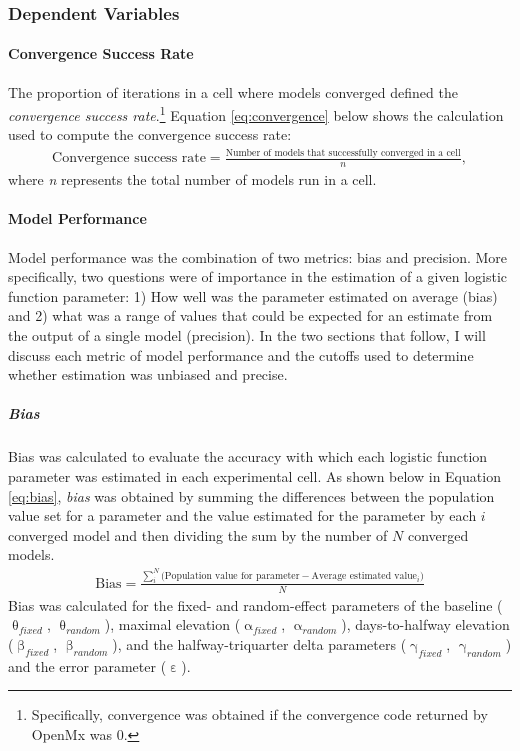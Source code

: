 \documentclass[
12pt, %
twoside,
english]{guelphthesis}
\begin{document}
\hypertarget{dependent-variables}{%
\subsubsection{Dependent Variables}\label{dependent-variables}}

\hypertarget{convergence}{%
\paragraph{Convergence Success Rate}\label{convergence}}

The proportion of iterations in a cell where models converged defined
the \emph{convergence success rate}.\footnote{Specifically, convergence was obtained if the convergence code returned by OpenMx was 0.} Equation \eqref{eq:convergence} below shows the calculation used to compute the convergence success rate:
\begin{align}
  \text{Convergence success rate} =  \frac{\text{Number of models that successfully converged in a cell}}{n},
  \label{eq:convergence} 
\end{align}
\noindent where \emph{n} represents the total number of models run in a cell.

\hypertarget{model-performance}{%
\paragraph{Model Performance}\label{model-performance}}

Model performance was the combination of two metrics: bias and precision. More specifically, two questions were of importance in the estimation of a given logistic function parameter: 1) How well was the parameter estimated on average (bias) and 2) what was a range of values that could be expected for an estimate from the output of a single model (precision). In the two sections that follow, I will discuss each metric of model performance and the cutoffs used to determine whether estimation was unbiased and precise.

\hypertarget{bias-comp}{%
\subparagraph{Bias}\label{bias-comp}}

Bias was calculated to evaluate the accuracy with which each logistic
function parameter was estimated in each experimental cell. As shown below in Equation
\eqref{eq:bias}, \emph{bias} was obtained by summing the differences
between the population value set for a parameter and the value estimated for the parameter by each \(i\) converged model and then dividing the sum by the number of \(N\) converged models.
\begin{align}
  \text{Bias} = \frac{\sum_i^N\text{(Population value for parameter} - \text{Average estimated value}_i)}{N}
  \label{eq:bias} 
\end{align}
\noindent Bias was calculated for the fixed- and random-effect parameters of the baseline (\(\uptheta_{fixed}\), \(\uptheta_{random}\)), maximal elevation (\(\upalpha_{fixed}\), \(\upalpha_{random}\)), days-to-halfway elevation (\(\upbeta_{fixed}\), \(\upbeta_{random}\)), and the halfway-triquarter delta parameters (\(\upgamma_{fixed}\), \(\upgamma_{random}\)) and the error parameter (\(\upepsilon\)).
\end{document}
